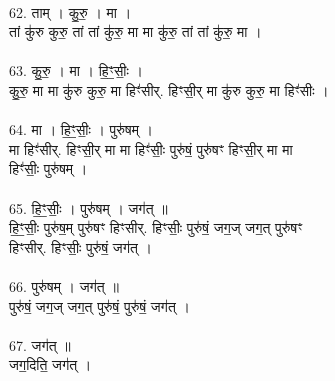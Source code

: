 \\
62. ताम् । कु॒रु॒ । मा ।\\
तां कु॑रु कुरु॒ तां तां कु॑रु॒ मा मा कु॑रु॒ तां तां कु॑रु॒ मा ।\\
\\
63. कु॒रु॒ । मा । हि॒ꣳ॒सीः॒ ।\\
कु॒रु॒ मा मा कु॑रु कुरु॒ मा हिꣳ॑सीर्. हिꣳसी॒र् मा कु॑रु कुरु॒ मा हिꣳ॑सीः ।\\
\\
64. मा । हि॒ꣳ॒सीः॒ । पुरु॑षम् ।\\
मा हिꣳ॑सीर्. हिꣳसी॒र् मा मा हिꣳ॑सीः॒ पुरु॑षं॒ पुरु॑षꣳ हिꣳसी॒र् मा मा\\
हिꣳ॑सीः॒ पुरु॑षम् ।\\
\\
65. हि॒ꣳ॒सीः॒ । पुरु॑षम् । जग॑त् ॥\\
हि॒ꣳ॒सीः॒ पुरु॑ष॒म् पुरु॑षꣳ हिꣳसीर्. हिꣳसीः॒ पुरु॑षं॒ जग॒ज् जग॒त् पुरु॑षꣳ\\
हिꣳसीर्. हिꣳसीः॒ पुरु॑षं॒ जग॑त् ।\\
\\
66. पुरु॑षम् । जग॑त् ॥\\
पुरु॑षं॒ जग॒ज् जग॒त् पुरु॑षं॒ पुरु॑षं॒ जग॑त् ।\\
\\
67. जग॑त् ॥\\
जग॒दिति॒ जग॑त् ।\\
\\
